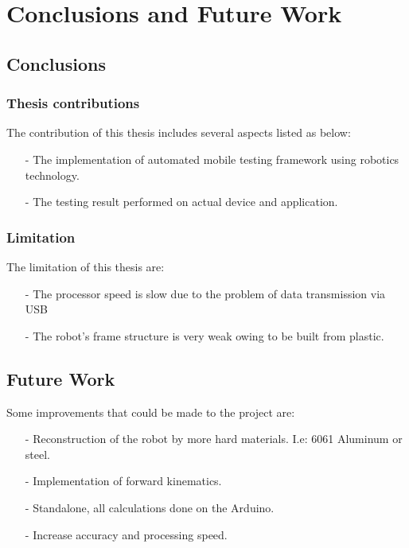 \chapter{Conclusions and Future Work}

\section{Conclusions}
	\subsection{Thesis contributions}
	The contribution of this thesis includes several aspects listed as below:
	\begin{itemize}
		\item[-] The implementation of automated mobile testing framework using robotics technology.
		\item[-] The testing result performed on actual device and application.
	\end{itemize}
	\subsection{Limitation}
	The limitation of this thesis are:
	\begin{itemize}
		\item[-] The processor speed is slow due to the problem of data transmission via USB
		\item[-] The robot's frame structure is very weak owing to be built from plastic.

	\end{itemize}

\section{Future Work}
	Some improvements that could be made to the project are:
	\begin{itemize}
		\item[-] Reconstruction of the robot by more hard materials. I.e: 6061 Aluminum or steel.
		\item[-] Implementation of forward kinematics.
		\item[-] Standalone, all calculations done on the Arduino.
		\item[-] Increase accuracy and processing speed.
	\end{itemize}
